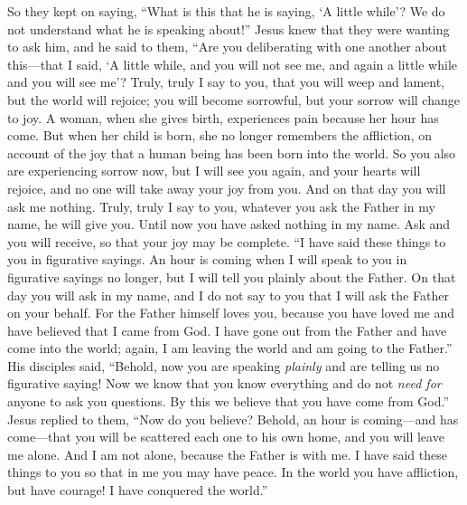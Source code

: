 \begin{biblechapter}
\verse So they kept on saying, “What is this that he is saying, ‘A little while’? We do not understand what he is speaking about!”
\verse Jesus knew that they were wanting to ask him, and he said to them, “Are you deliberating with one another about this—that I said, ‘A little while, and you will not see me, and again a little while and you will see me’?
\verse Truly, truly I say to you, that you will weep and lament, but the world will rejoice; you will become sorrowful, but your sorrow will change to joy.
\verse A woman, when she gives birth, experiences pain because her hour has come. But when her child is born, she no longer remembers the affliction, on account of the joy that a human being has been born into the world.
\verse So you also are experiencing sorrow now, but I will see you again, and your hearts will rejoice, and no one will take away your joy from you.
\verse And on that day you will ask me nothing. Truly, truly I say to you, whatever you ask the Father in my name, he will give you.
\verse Until now you have asked nothing in my name. Ask and you will receive, so that your joy may be complete.
 “I have said these things to you in figurative sayings. An hour is coming when I will speak to you in figurative sayings no longer, but I will tell you plainly about the Father.
\verse On that day you will ask in my name, and I do not say to you that I will ask the Father on your behalf.
\verse For the Father himself loves you, because you have loved me and have believed that I came from God.
\verse I have gone out from the Father and have come into the world; again, I am leaving the world and am going to the Father.”
\verse His disciples said, “Behold, now you are speaking \textit{plainly} and are telling us no figurative saying!
\verse Now we know that you know everything and do not \textit{need for} anyone to ask you questions. By this we believe that you have come from God.”
\verse Jesus replied to them, “Now do you believe?
\verse Behold, an hour is coming—and has come—that you will be scattered each one to his own home, and you will leave me alone. And I am not alone, because the Father is with me.
\verse I have said these things to you so that in me you may have peace. In the world you have affliction, but have courage! I have conquered the world.”
\end{biblechapter}

